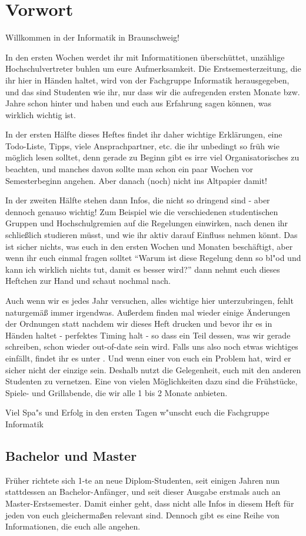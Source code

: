 \section*{Vorwort}

\renewcommand{\baselinestretch}{0.75}\normalsize
Willkommen in der Informatik in Braunschweig!

In den ersten Wochen werdet ihr mit Informatitionen überschüttet, 
unzählige Hochschulvertreter buhlen um eure Aufmerksamkeit. Die 
Erstsemesterzeitung, die ihr hier in Händen haltet, wird von der 
Fachgruppe Informatik herausgegeben, und das sind Studenten wie 
ihr, nur dass wir die aufregenden ersten Monate bzw. Jahre schon 
hinter und haben und euch aus Erfahrung sagen können, was 
wirklich wichtig ist.

In der ersten Hälfte dieses Heftes findet ihr daher wichtige 
Erklärungen, eine Todo-Liste, Tipps, viele Ansprachpartner, 
etc. die ihr unbedingt so früh wie möglich lesen solltet, denn 
gerade zu Beginn gibt es irre viel Organisatorisches zu beachten, 
und manches davon sollte man schon ein paar Wochen vor 
Semesterbeginn angehen. Aber danach (noch) nicht ins Altpapier damit!

In der zweiten Hälfte stehen dann Infos, die nicht so dringend
sind - aber dennoch genauso wichtig! Zum Beispiel wie die 
verschiedenen studentischen Gruppen und Hochschulgremien auf 
die Regelungen einwirken, nach denen ihr schließlich studieren 
müsst, und wie ihr aktiv darauf Einfluss nehmen könnt. Das ist sicher 
nichts, was euch in den ersten Wochen und Monaten beschäftigt, aber 
wenn ihr euch einmal fragen solltet "`Warum ist diese Regelung denn 
so bl"od und kann ich wirklich nichts tut, damit es besser wird?"' 
dann nehmt euch dieses Heftchen zur Hand und schaut nochmal nach.

Auch wenn wir es jedes Jahr versuchen, alles wichtige hier 
unterzubringen, fehlt naturgemäß immer irgendwas. Außerdem finden
mal wieder einige Änderungen der Ordnungen statt nachdem wir dieses 
Heft drucken und bevor ihr es in Händen haltet - perfektes Timing 
halt - so dass ein Teil dessen, was wir gerade schreiben, schon 
wieder out-of-date sein wird. Falls uns also 
noch etwas wichtiges einfällt, findet ihr es unter 
\mbox{}. Und wenn einer von euch 
ein Problem hat, wird er sicher nicht der einzige sein. Deshalb 
nutzt die Gelegenheit, euch mit den anderen Studenten zu vernetzen. 
Eine von vielen Möglichkeiten dazu sind die Frühstücke, Spiele- und 
Grillabende, die wir alle 1 bis 2 Monate anbieten.

Viel Spa"s und Erfolg in den ersten Tagen w"unscht euch die 
Fachgruppe Informatik

\subsection*{Bachelor und Master}
Früher richtete sich 1-te an neue Diplom-Studenten, seit einigen 
Jahren nun stattdessen an Bachelor-Anfänger, und seit dieser Ausgabe 
erstmals auch an Master-Erstsemester. Damit einher geht, dass nicht 
alle Infos in diesem Heft für jeden von euch gleichermaßen relevant 
sind. Dennoch gibt es eine Reihe von Informationen, die euch alle 
angehen.

\renewcommand{\baselinestretch}{1}\normalsize